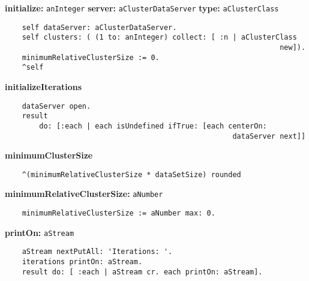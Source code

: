 {\bf initialize:} {\tt anInteger} {\bf server:} {\tt aClusterDataServer} {\bf type:} {\tt aClusterClass}
\begin{verbatim}
    self dataServer: aClusterDataServer.
    self clusters: ( (1 to: anInteger) collect: [ :n | aClusterClass 
                                                                new]).
    minimumRelativeClusterSize := 0.
    ^self

\end{verbatim}
{\bf initializeIterations}
\begin{verbatim}
    dataServer open.
    result 
        do: [:each | each isUndefined ifTrue: [each centerOn: 
                                                     dataServer next]]

\end{verbatim}
{\bf minimumClusterSize}
\begin{verbatim}
    ^(minimumRelativeClusterSize * dataSetSize) rounded

\end{verbatim}
{\bf minimumRelativeClusterSize:} {\tt aNumber}
\begin{verbatim}
    minimumRelativeClusterSize := aNumber max: 0.

\end{verbatim}
{\bf printOn:} {\tt aStream}
\begin{verbatim}
    aStream nextPutAll: 'Iterations: '.
    iterations printOn: aStream.
    result do: [ :each | aStream cr. each printOn: aStream].

\end{verbatim}

